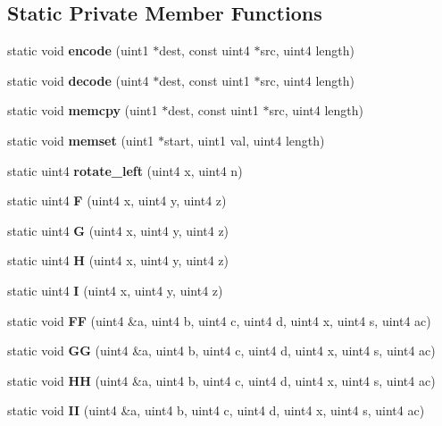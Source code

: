 \subsection*{Static Private Member Functions}
\begin{DoxyCompactItemize}
\item 
static void {\bfseries encode} (uint1 $\ast$dest, const uint4 $\ast$src, uint4 length)\label{classMD5_aeacf39bf24a425d4eaf035466e0ee009}

\item 
static void {\bfseries decode} (uint4 $\ast$dest, const uint1 $\ast$src, uint4 length)\label{classMD5_a0aeb8e4141d80e9b33e5fcab91f797e6}

\item 
static void {\bfseries memcpy} (uint1 $\ast$dest, const uint1 $\ast$src, uint4 length)\label{classMD5_a5db7422eee66dd26ef731b8e783951b7}

\item 
static void {\bfseries memset} (uint1 $\ast$start, uint1 val, uint4 length)\label{classMD5_ae2affb1e7d58a204d9ae367ea7b51c36}

\item 
static uint4 {\bfseries rotate\-\_\-left} (uint4 x, uint4 n)\label{classMD5_a64f84f0aef8679b0c77858e0c59822b9}

\item 
static uint4 {\bfseries F} (uint4 x, uint4 y, uint4 z)\label{classMD5_a2934208483fbd86327076a11ded14971}

\item 
static uint4 {\bfseries G} (uint4 x, uint4 y, uint4 z)\label{classMD5_a9abb73967eb7219c23faf69a4e80eb71}

\item 
static uint4 {\bfseries H} (uint4 x, uint4 y, uint4 z)\label{classMD5_af0a3d0593a4a4fc964a8d5beb2348bbc}

\item 
static uint4 {\bfseries I} (uint4 x, uint4 y, uint4 z)\label{classMD5_ab363834e0160109ba1c7aaf53409e7c1}

\item 
static void {\bfseries F\-F} (uint4 \&a, uint4 b, uint4 c, uint4 d, uint4 x, uint4 s, uint4 ac)\label{classMD5_a31479b157441ace2dbc2ae0edd0d2e38}

\item 
static void {\bfseries G\-G} (uint4 \&a, uint4 b, uint4 c, uint4 d, uint4 x, uint4 s, uint4 ac)\label{classMD5_a8ebdbe52608e522516d1759a31753212}

\item 
static void {\bfseries H\-H} (uint4 \&a, uint4 b, uint4 c, uint4 d, uint4 x, uint4 s, uint4 ac)\label{classMD5_aaad039caf0b33abf1bf3f3589166543c}

\item 
static void {\bfseries I\-I} (uint4 \&a, uint4 b, uint4 c, uint4 d, uint4 x, uint4 s, uint4 ac)\label{classMD5_a7af0184654644964ecdb57b1203e5ec7}

\end{DoxyCompactItemize}
